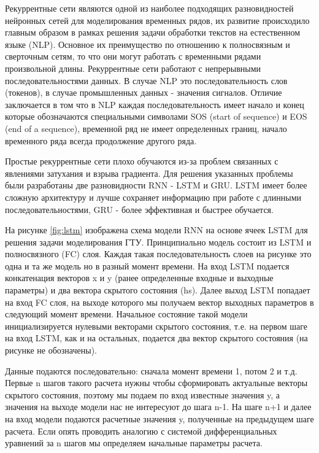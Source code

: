 \documentclass[12pt,a4paper]{article}
\begin{document}
Рекуррентные сети являются одной из наиболее подходящих разновидностей нейронных сетей для моделирования временных рядов, их развитие происходило главным образом в рамках решения задачи обработки текстов на естественном языке (NLP). Основное их преимущество по отношению к полносвязным и сверточным сетям, то что они могут работать с временными рядами произвольной длины. Рекуррентные сети работают с непрерывными последовательностями данных. В случае NLP это  последовательность слов (токенов), в случае промышленных данных - значения сигналов. Отличие заключается в том что в NLP каждая последовательность имеет начало и конец которые обозначаются специальными символами SOS (start of sequence) и EOS (end of a sequence), временной ряд не имеет определенных границ, начало временного ряда всегда продолжение другого ряда.

Простые рекуррентные сети плохо обучаются из-за проблем связанных с явлениями затухания и взрыва градиента. Для решения указанных проблемы были разработаны две разновидности RNN - LSTM и GRU. LSTM имеет более сложную архитектуру и лучше сохраняет информацию при работе с длинными последовательностями, GRU - более эффективная и быстрее обучается.\cite{habr_lstm_gru}

На рисунке \ref{fig:lstm} изображена схема модели RNN на основе ячеек LSTM для решения задачи моделирования ГТУ. Принципиально модель состоит из LSTM и полносвязного (FC) слоя. Каждая такая последовательность слоев на рисунке это одна и та же модель но в разный момент времени. На вход LSTM подается конкатенация векторов x и y (ранее определенные входные и выходные параметры) и два вектора скрытого состояния (hs). Далее выход LSTM попадает на вход FC слоя, на выходе которого мы получаем вектор выходных параметров в следующий момент времени. Начальное состояние такой модели инициализируется нулевыми векторами скрытого состояния, т.е. на первом шаге на вход LSTM, как и на остальных, подается два вектор скрытого состояния (на рисунке не обозначены).

Данные подаются последовательно: сначала момент времени 1, потом 2 и т.д. Первые n шагов такого расчета нужны чтобы сформировать актуальные векторы скрытого состояния, поэтому мы подаем по вход известные значения y, а значения на выходе модели нас не интересуют до шага n-1. На шаге n+1 и далее на вход модели подаются расчетные значения y, полученные на предыдущем шаге расчета. Если опять проводить аналогию с системой дифференциальных уравнений за n шагов мы определяем начальные параметры расчета.
\end{document}
